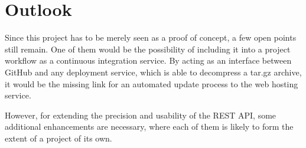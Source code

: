 \section{Outlook}
\label{sec:outlook}

Since this project has to be merely seen as a proof of concept, a few open points still remain. One of them would be the possibility of including it into a project workflow as a continuous integration service. By acting as an interface between GitHub and any deployment service, which is able to decompress a tar.gz archive, it would be the missing link for an automated update process to the web hosting service.

However, for extending the precision and usability of the REST API, some additional enhancements are necessary, where each of them is likely to form the extent of a project of its own.



